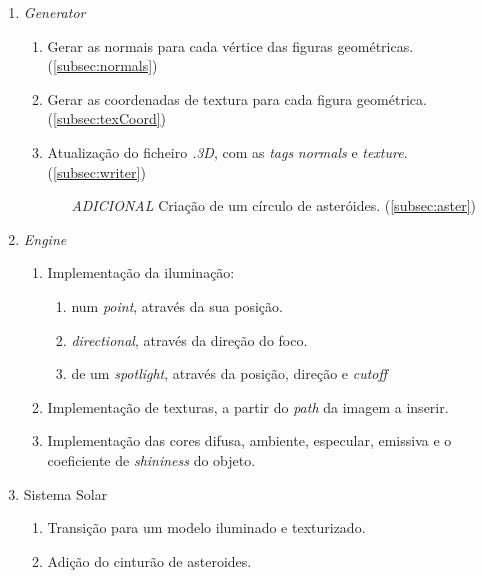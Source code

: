 \documentclass[runningheads]{llncs}
\begin{document}
    \begin{enumerate}
        \item \textit{Generator}
        \begin{enumerate}
            \item Gerar as normais para cada vértice das figuras geométricas. (\ref{subsec:normals})
            \item Gerar as coordenadas de textura para cada figura geométrica. (\ref{subsec:texCoord})
            \item Atualização do ficheiro \textit{.3D}, com as \textit{tags} 
                  \textit{normals} e \textit{texture}.(\ref{subsec:writer})
            \begin{enumerate}
                \item[\textit{ADICIONAL}]{Criação de um círculo de asteróides.} (\ref{subsec:aster})
            \end{enumerate}
        \end{enumerate}
        \item \textit{Engine}
        \begin{enumerate}
            \item Implementação da iluminação:
            \begin{enumerate}
                \item num \textit{point}, através da sua posição.
                \item \textit{directional}, através da direção do foco.
                \item de um \textit{spotlight}, através da posição, direção e \textit{cutoff}
            \end{enumerate}
            \item Implementação de texturas, a partir do \textit{path} da imagem a inserir.
            \item Implementação das cores difusa, ambiente, especular, emissiva e o coeficiente
                  de \textit{shininess} do objeto.
        \end{enumerate}
        \item Sistema Solar 
        \begin{enumerate}
            \item Transição para um modelo iluminado e texturizado.
            \item Adição do cinturão de asteroides.
        \end{enumerate}
    \end{enumerate}
    
\end{document}
